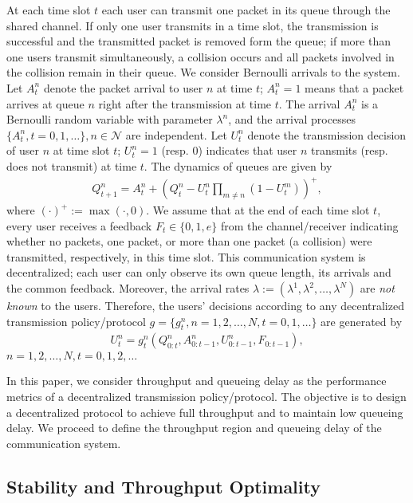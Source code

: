 \documentclass[onecolumn,draftcls]{IEEEtran}
\begin{document}
At each time slot $t$ each user can transmit one packet in its queue through the shared channel.
If only one user transmits in a time slot, the transmission is successful and the transmitted packet is removed form the queue; if more than one users transmit simultaneously, a collision occurs and all packets involved in the collision remain in their queue.
We consider Bernoulli arrivals to the system.
Let $A^n_t$ denote the packet arrival to user $n$ at time $t$;
$A^n_t=1$ means that a packet arrives at queue $n$ right after the transmission at time $t$.
The arrival $A^n_t$ is a Bernoulli random variable with parameter $\lambda^n$, and the
arrival processes
$\{A^n_t, t=0,1,\dots\}, n \in \mathcal{N}$ are independent.
Let $U^n_t$ denote the transmission decision of user $n$ at time slot $t$; $U^n_t=1$ (resp. $0$) indicates that user $n$ transmits (resp. does not transmit) at time $t$. 
The dynamics of queues are given by
\begin{align}
Q^n_{t+1} = A^n_t+\left(Q^n_t - U^n_t\prod_{m\neq n}\left(1-U^m_t\right) \right)^+,
\label{eq:qdynamics}
\end{align}
where $(\cdot)^+ := \max(\cdot,0)$.
We assume that at the end of each time slot $t$, every user receives a feedback $F_t\in \{0,1,e\}$ from the channel/receiver indicating whether no packets, one packet, or more than one packet (a collision) were transmitted, respectively, in this time slot.
This communication system is decentralized; each user can only observe its own queue length, its arrivals and the common feedback.
Moreover, the arrival rates $\lambda := (\lambda^1,\lambda^2,\dots,\lambda^N)$ are \textit{not known} to the users.
Therefore, the users' decisions according to any decentralized transmission policy/protocol $g=\{g^n_t, n=1,2,\dots,N, t=0,1,\dots\}$ are generated by
\begin{align}
U^n_t = g^n_t(Q^n_{0:t}, A^n_{0:t-1}, U^n_{0:t-1}, F_{0:t-1}),
\label{eq:policy}
\end{align}
$ n=1,2,\dots,N, t=0,1,2,\dots$

In this paper, we consider throughput and queueing delay as the performance metrics of a decentralized transmission policy/protocol.
The objective is to design a decentralized protocol to achieve full throughput and to maintain low queueing delay. We proceed to define the throughput region and queueing delay of the communication system.


\subsection{Stability and Throughput Optimality}\label{sub:model:throughput}
\end{document}
